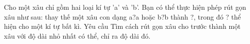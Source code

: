 Cho một xâu chỉ gồm hai loại kí tự 'a' và 'b'. Bạn có thể thực hiện phép rút gọn xâu như sau: thay thế một xâu con dạng a?a hoặc b?b thành ?, trong đó ? thể hiện cho một kí tự bất kì.
   Yêu cầu  
Tìm cách rút gọn xâu cho trước thành một xâu với độ dài nhỏ nhất có thể, chỉ ra độ dài đó.